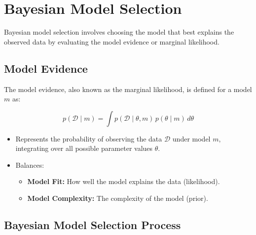 \section{Bayesian Model Selection}

Bayesian model selection involves choosing the model that best explains the observed data by evaluating the model evidence or marginal likelihood.

\subsection{Model Evidence}

The model evidence, also known as the marginal likelihood, is defined for a model $m$ as:

\[
    p(\mathcal{D} \mid m) = \int p(\mathcal{D} \mid \theta, m) \, p(\theta \mid m) \, d\theta
\]

\begin{itemize}
    \item Represents the probability of observing the data $\mathcal{D}$ under model $m$, integrating over all possible parameter values $\theta$.
    \item Balances:
          \begin{itemize}
              \item \textbf{Model Fit:} How well the model explains the data (likelihood).
              \item \textbf{Model Complexity:} The complexity of the model (prior).
          \end{itemize}
\end{itemize}

\subsection{Bayesian Model Selection Process}

